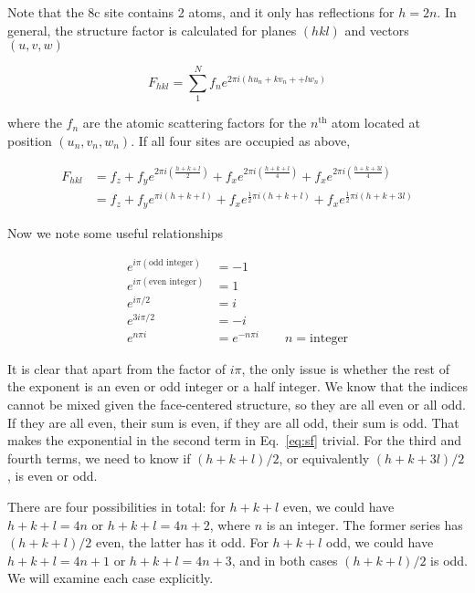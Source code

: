 \documentclass[aps,amsmath,amssymb,prb,superscriptaddress,longtable,preprint,fleqn]{revtex4}
\begin{document}
Note that the 8c site contains 2 atoms, and it only has reflections for $h=2n$. In general, the structure factor is calculated\cite{warren69} for planes $(hkl)$ and vectors $(u,v,w)$

\begin{equation}
F_{hkl} = \sum_1^N f_n e^{2\pi i\left(hu_n + kv_n + + lw_n\right)}
\end{equation}

\noindent where the $f_n$ are the atomic scattering factors for the $n^{\text{th}}$ atom located at position $(u_n,v_n,w_n)$. If all four sites are occupied as above,

\begin{align}
F_{hkl} &= f_z + f_y e^{2\pi i\left(\frac{h+k+l}{2}\right)} + f_x e^{2\pi i\left(\frac{h+k+l}{4}\right)} + f_x e^{2\pi i\left(\frac{h+k+3l}{4}\right)} \nonumber \\
&= f_z + f_y e^{\pi i\left(h+k+l\right)} + f_x e^{\frac{1}{2}\pi i\left(h+k+l\right)} + f_x e^{\frac{1}{2}\pi i\left(h+k+3l\right)} \label{eq:sf}
\end{align}

Now we note some useful relationships

\begin{align}
e^{i\pi(\text{odd integer})} &= -1\\
e^{i\pi(\text{even integer})} &= 1\\
e^{i\pi/2} &= i\\
e^{3i\pi/2} &= -i\\
e^{n\pi i} &= e^{-n\pi i} \qquad n=\text{integer}
\end{align}

It is clear that apart from the factor of $i\pi$, the only issue is whether the rest of the exponent is an even or odd integer or a half integer. We know that the indices cannot be mixed given the face-centered structure, so they are all even or all odd. If they are all even, their sum is even, if they are all odd, their sum is odd. That makes the exponential in the second term in Eq.~\ref{eq:sf} trivial. For the third and fourth terms, we need to know if $(h+k+l)/2$, or equivalently $(h+k+3l)/2$, is even or odd. 

There are four possibilities in total: for $h+k+l$ even, we could have $h+k+l=4n$ or $h+k+l=4n+2$, where $n$ is an integer. The former series has $(h+k+l)/2$ even, the latter has it odd. For $h+k+l$ odd, we could have $h+k+l=4n+1$ or $h+k+l=4n+3$, and in both cases $(h+k+l)/2$ is odd. We will examine each case explicitly. 
\end{document}
